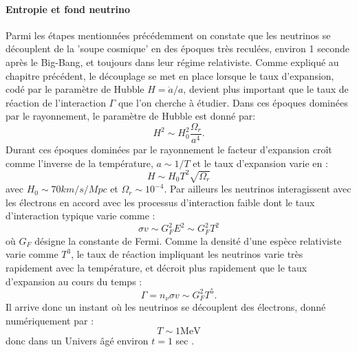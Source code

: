 \paragraph{Entropie et fond neutrino} 
Parmi les étapes mentionnées précédemment on constate que les neutrinos se découplent de la 'soupe cosmique' en des époques très reculées, environ 1 seconde après le Big-Bang, et toujours dans leur régime relativiste. Comme expliqué au chapitre précédent, le découplage se met en place lorsque le taux d'expansion, codé par le paramètre de Hubble $H=\dot a /a$, devient plus important que le taux de réaction de l'interaction $\Gamma$ que l'on cherche à étudier. Dans ces époques dominées par le rayonnement, le paramètre de Hubble est donné par:
\begin{equation}
H^2\sim H_0^2 \frac{\Omega_r}{a^4}.
\end{equation}
Durant ces époques dominées par le rayonnement le facteur d'expansion croît comme l'inverse de la température, $a\sim 1/T$ et le taux d'expansion varie en :
\begin{equation}
H\sim H_0 T^2 \sqrt{\Omega_r}
\end{equation}
avec $H_0\sim 70 km/s/Mpc$ et $\Omega_r \sim 10^{-4}$. Par ailleurs les neutrinos interagissent avec les électrons en accord avec les processus d'interaction faible dont le taux d'interaction  typique varie comme :
\begin{equation}
\sigma v \sim G_F^2 E^2 \sim G_F^2 T^2
\end{equation}
où $G_F$ désigne la constante de Fermi. Comme la densité d'une espèce relativiste varie comme $T^3$, le taux de réaction impliquant les neutrinos varie très rapidement avec la température, et décroit plus rapidement que le taux d'expansion au cours du temps :
\begin{equation}
\Gamma =n_\nu \sigma v \sim G_F^2 T^5.
\end{equation}
Il arrive donc un instant où les neutrinos se découplent des électrons, donné numériquement par :
\begin{equation}
T\sim 1 \mathrm{MeV}
\end{equation}
donc dans un Univers âgé environ $t=1$ sec .

